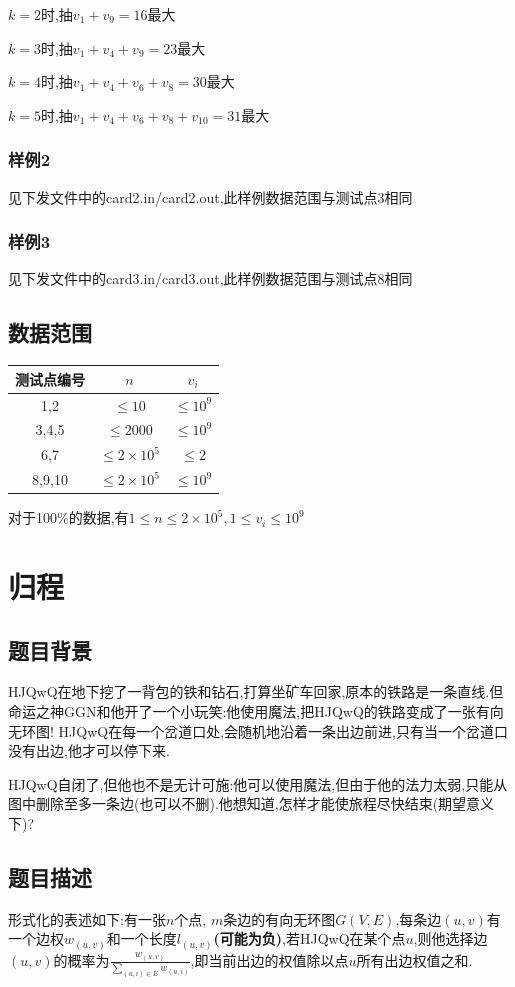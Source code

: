 \documentclass[12pt]{ctexart}
\begin{document}
$k=2$时,抽$v_1+v_9=16$最大

$k=3$时,抽$v_1+v_4+v_9=23$最大

$k=4$时,抽$v_1+v_4+v_6+v_8=30$最大

$k=5$时,抽$v_1+v_4+v_6+v_8+v_{10}=31$最大
\subsubsection{样例2}
见下发文件中的card2.in/card2.out,此样例数据范围与测试点3相同
\subsubsection{样例3}
见下发文件中的card3.in/card3.out,此样例数据范围与测试点8相同
\subsection{数据范围}
\begin{center}
	\begin{tabular}{|c|c|c|}
		\hline 测试点编号&$n$&$v_i$\\
		\hline 1,2&$\le10$&$\le10^9$\\
		\hline 3,4,5&$\le2000$&$\le10^9$\\
		\hline 6,7&$\le2\times10^5$&$\le2$\\
		\hline 8,9,10&$\le2\times10^5$&$\le10^9$\\
		\hline
	\end{tabular}
\end{center}
对于100\%的数据,有$1\le n\le2\times10^5,1\le v_i\le10^9$
\newpage
\section{归程}
\subsection{题目背景}
HJQwQ在地下挖了一背包的铁和钻石,打算坐矿车回家,原本的铁路是一条直线.但命运之神GGN和他开了一个小玩笑:他使用魔法,把HJQwQ的铁路变成了一张有向无环图! HJQwQ在每一个岔道口处,会随机地沿着一条出边前进,只有当一个岔道口没有出边,他才可以停下来.

HJQwQ自闭了,但他也不是无计可施:他可以使用魔法,但由于他的法力太弱,只能从图中删除至多一条边(也可以不删).他想知道,怎样才能使旅程尽快结束(期望意义下)?
\subsection{题目描述}
形式化的表述如下:有一张$n$个点, $m$条边的有向无环图$G(V,E)$,每条边$(u,v)$有一个边权$w_{(u,v)}$和一个长度$l_{(u,v)}$\textbf{(可能为负)},若HJQwQ在某个点$u$,则他选择边$(u,v)$的概率为$\frac{w_{(u,v)}}{\sum\limits_{(u,i)\in E}w_{(u,i)}}$,即当前出边的权值除以点$u$所有出边权值之和.
\end{document}
